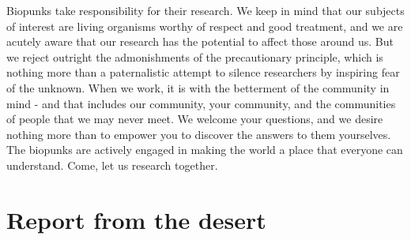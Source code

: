 \documentclass[11pt,twoside,a4paper]{book}
\begin{document}
\begin{center}
\begin{minipage}[ht]{0.95\textwidth}
	Biopunks take responsibility for their research. We keep in mind that our subjects of interest are living organisms worthy of respect and good treatment, and we are acutely aware that our research has the potential to affect those around us. But we reject outright the admonishments of the precautionary principle, which is nothing more than a paternalistic attempt to silence researchers by inspiring fear of the unknown. When we work, it is with the betterment of the community in mind - and that includes our community, your community, and the communities of people that we may never meet. We welcome your questions, and we desire nothing more than to empower you to discover the answers to them yourselves. ~\\
	
	The biopunks are actively engaged in making the world a place that everyone can understand. Come, let us research together. ~\\
\end{minipage} \end{center}


\chapter{Report from the desert}
\end{document}
